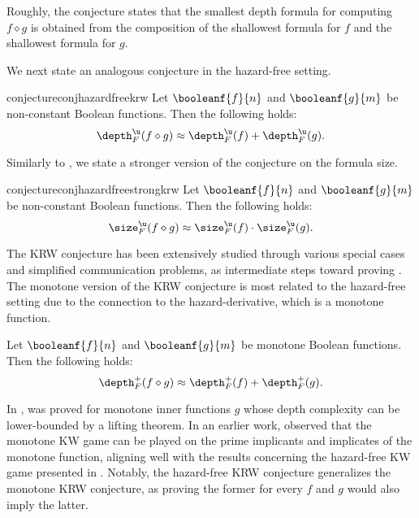 \documentclass[acmsmall, nonacm, authorversion]{acmart}
\begin{document}
Roughly, the conjecture states that the smallest depth formula for computing $f\diamond g$ is obtained from the composition of the shallowest formula for $f$ and the shallowest formula for $g$.

We next state an analogous conjecture in the hazard-free setting. 
\begin{restatable}{conjecture}{conjhazardfreekrw}\label{conj:hazard-free-krw}
Let $\booleanf{f}{n}$ and $\booleanf{g}{m}$ be non-constant Boolean functions. Then the following holds:
\[
\depth_F^\u(f\diamond g)\approx \depth_F^\u(f)+\depth_F^\u(g).
\]
\end{restatable}

Similarly to \cite{DM18, dRMN+20}, we state a stronger version of the conjecture on the formula size.

\begin{restatable}{conjecture}{conjhazardfreestrongkrw}\label{conj:hazard-free-strong-krw}
Let $\booleanf{f}{n}$ and $\booleanf{g}{m}$ be non-constant Boolean functions. Then the following holds:
\[
\size_F^\u(f\diamond g)\approx \size_F^\u(f)
\cdot \size_F^\u(g).
\]
\end{restatable}

The KRW conjecture has been extensively studied through various special cases and simplified communication problems, as intermediate steps toward proving . The monotone version of the KRW conjecture is most related to the hazard-free setting due to the connection to the hazard-derivative, which is a monotone function.
\begin{conjecture} \label{conj:monotone-krw}
Let $\booleanf{f}{n}$ and $\booleanf{g}{m}$ be monotone Boolean functions. Then the following holds:
\[
\depth_F^+(f\diamond g) \approx \depth_F^+(f)+\depth_F^+(g).
\]
\end{conjecture}
In \cite[Theorem 3.1]{dRMN+20},  was proved for monotone inner functions $g$ whose depth complexity can be lower-bounded by a lifting theorem. In an earlier work, \cite{KRW95} observed that the monotone KW game can be played on the prime implicants and implicates of the monotone function, aligning well with the results concerning the hazard-free KW game presented in . Notably, the hazard-free KRW conjecture generalizes the monotone KRW conjecture, as proving the former for every $f$ and $g$ would also imply the latter.
\end{document}
